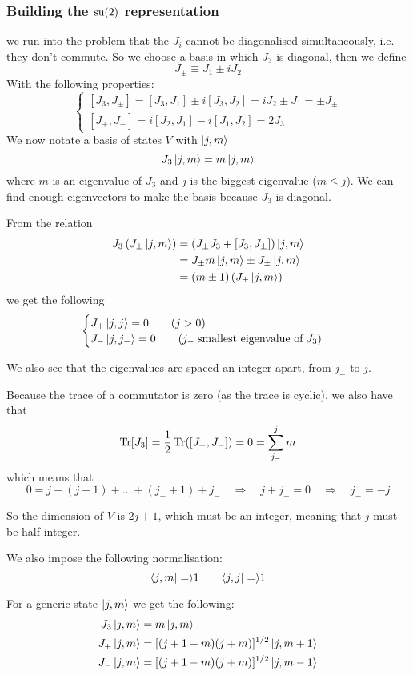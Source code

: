 \subsubsection{Building the $\operatorname{su}(2)$ representation} we run into the problem that the $J_i$ cannot be diagonalised simultaneously, i.e. they don't commute.
So we choose a basis in which $J_3$ is diagonal, then we define
\[ J_\pm \equiv J_1 \pm iJ_2 \]
With the following properties:
\[ \begin{cases}
[J_3,J_\pm] = [J_3,J_1]\pm i[J_3,J_2] = iJ_2 \pm J_1 = \pm J_\pm \\
[J_+, J_-] = i[J_2,J_1] - i[J_1,J_2] = 2J_3
\end{cases} \]
We now notate a basis of states $V$ with $\left| j,m \right\rangle$
\[ J_3\left| j,m \right\rangle = m\left| j,m \right\rangle \]
where $m$ is an eigenvalue of $J_3$ and $j$ is the biggest eigenvalue ($m\leq j$). We can find enough eigenvectors to make the basis because $J_3$ is diagonal.

From the relation 
\begin{align}
J_3 \left(J_\pm\left| j,m \right\rangle\right) &= \left(J_\pm J_3 + [J_3,J_\pm]\right)\left| j,m \right\rangle \\
&= J_\pm m \left| j,m \right\rangle \pm J_\pm \left| j,m \right\rangle \\
&= (m\pm 1)\left(J_\pm\left| j,m \right\rangle\right)
\end{align}
we get the following
\[ \begin{cases}
J_+\left| j,j \right\rangle = 0 \qquad (j>0) \\
J_-\left| j,j_- \right\rangle = 0 \qquad (j_- \;\text{smallest eigenvalue of}\; J_3)
\end{cases} \]

We also see that the eigenvalues are spaced an integer apart, from $j_-$ to $j$.


Because the trace of a commutator is zero (as the trace is cyclic), we also have that 
\[ \operatorname{Tr}[J_3] = \frac{1}{2}\operatorname{Tr}([J_+,J_-]) = 0 = \sum_{j_-}^j m \]
which means that
\[ 0 = j + (j-1) + \ldots + (j_-+1) +j_- \quad \Rightarrow \quad j+j_- = 0 \quad \Rightarrow \quad j_- = -j \]

So the dimension of $V$ is $2j+1$, which must be an integer, meaning that $j$ must be half-integer.

We also impose the following normalisation:
\[ \braket{j,m} = 1 \qquad \braket{j,j} = 1\]

For a generic state $\left| j,m \right\rangle$ we get the following:
\begin{align}
J_3\left| j,m \right\rangle &= m\left| j,m \right\rangle \\
J_+\left| j,m \right\rangle &= [(j+1+m)(j+m)]^{1/2} \left| j,m+1 \right\rangle \\
J_-\left| j,m \right\rangle &= [(j+1-m)(j+m)]^{1/2} \left| j,m-1 \right\rangle
\end{align}

